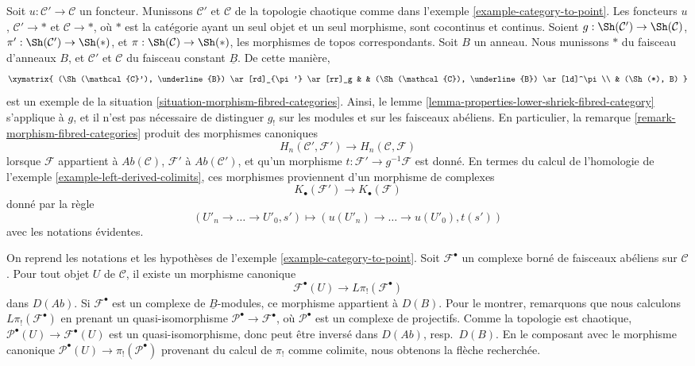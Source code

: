 \begin{example}
\label{example-morphism-categories}
Soit $u : \mathcal{C}' \to \mathcal{C}$ un foncteur. Munissons
$\mathcal{C}'$ et $\mathcal{C}$ de la topologie chaotique comme dans
l'exemple \ref{example-category-to-point}. Les foncteurs $u$,
$\mathcal{C}' \to *$ et $\mathcal{C} \to *$, où $*$ est la catégorie ayant
un seul objet et un seul morphisme, sont cocontinus et continus. Soient
$g : \Sh(\mathcal{C}') \to \Sh(\mathcal{C})$,
$\pi' : \Sh(\mathcal{C}') \to \Sh(*)$, et
$\pi : \Sh(\mathcal{C}) \to \Sh(*)$,
les morphismes de topos correspondants. Soit $B$ un anneau. Nous munissons
$*$ du faisceau d'anneaux $B$, et $\mathcal{C}'$ et $\mathcal{C}$ du
faisceau constant $\underline{B}$. De cette manière,
$$
\xymatrix{
(\Sh(\mathcal{C}'), \underline{B}) \ar[rd]_{\pi'} \ar[rr]_g & &
(\Sh(\mathcal{C}), \underline{B}) \ar[ld]^\pi \\
& (\Sh(*), B)
}
$$
est un exemple de la situation
\ref{situation-morphism-fibred-categories}. Ainsi, le
lemme \ref{lemma-properties-lower-shriek-fibred-category} s'applique à $g$,
et il n'est pas nécessaire de distinguer $g_!$ sur les modules et sur les
faisceaux abéliens. En particulier, la
remarque \ref{remark-morphism-fibred-categories} produit des morphismes
canoniques
$$
H_n(\mathcal{C}', \mathcal{F}')
\longrightarrow
H_n(\mathcal{C}, \mathcal{F})
$$
lorsque $\mathcal{F}$ appartient à $\textit{Ab}(\mathcal{C})$,
$\mathcal{F}'$ à $\textit{Ab}(\mathcal{C}')$, et qu'un morphisme
$t : \mathcal{F}' \to g^{-1}\mathcal{F}$ est donné. En termes du calcul de
l'homologie de l'exemple \ref{example-left-derived-colimits}, ces morphismes
proviennent d'un morphisme de complexes
$$
K_\bullet(\mathcal{F}') \longrightarrow K_\bullet(\mathcal{F})
$$
donné par la règle
$$
(U'_n \to \ldots \to U'_0, s') \longmapsto
(u(U'_n) \to \ldots \to u(U'_0), t(s'))
$$
avec les notations évidentes.
\end{example}

\begin{remark}
\label{remark-map-evaluation-to-derived}
On reprend les notations et les hypothèses de
l'exemple \ref{example-category-to-point}. Soit $\mathcal{F}^\bullet$ un
complexe borné de faisceaux abéliens sur $\mathcal{C}$. Pour tout objet $U$
de $\mathcal{C}$, il existe un morphisme canonique
$$
\mathcal{F}^\bullet(U) \longrightarrow L\pi_!(\mathcal{F}^\bullet)
$$
dans $D(\textit{Ab})$. Si $\mathcal{F}^\bullet$ est un complexe de
$\underline{B}$-modules, ce morphisme appartient à $D(B)$. Pour le montrer,
remarquons que nous calculons $L\pi_!(\mathcal{F}^\bullet)$ en prenant un
quasi-isomorphisme $\mathcal{P}^\bullet \to \mathcal{F}^\bullet$, où
$\mathcal{P}^\bullet$ est un complexe de projectifs. Comme la topologie est
chaotique, $\mathcal{P}^\bullet(U) \to \mathcal{F}^\bullet(U)$ est un
quasi-isomorphisme, donc peut être inversé dans $D(\textit{Ab})$, resp.\
$D(B)$. En le composant avec le morphisme canonique
$\mathcal{P}^\bullet(U) \to \pi_!(\mathcal{P}^\bullet)$ provenant du calcul
de $\pi_!$ comme colimite, nous obtenons la flèche recherchée.
\end{remark}

